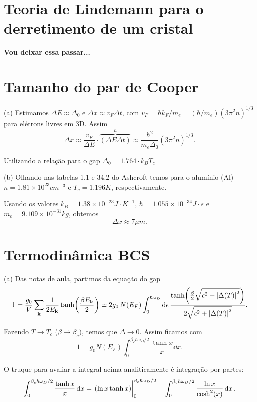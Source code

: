 \documentclass[a4paper,10pt]{article}
\begin{document}
\section{Teoria de Lindemann para o derretimento de um cristal}

\textbf{Vou deixar essa passar...}



\pagebreak


\section{Tamanho do par de Cooper}

(a) Estimamos $\Delta E \approx \Delta_0$ e $\Delta x \approx v_F \Delta t$, com $v_F = \hbar k_F / m_e = (\hbar/m_e) (3\pi^2 n)^{1/3}$ para elétrons livres em 3D. Assim
$$
\Delta x \approx
\frac{v_F}{\Delta E} \cdot \overbrace{(\Delta E \Delta t)}^{\hbar}
\approx \frac{\hbar^2}{m_e \Delta_0} (3\pi^2 n)^{1/3}.
$$

Utilizando a relação para o gap $\Delta_0 = 1.764 \cdot k_B T_c$

\n\n

(b) Olhando nas tabelas 1.1 e 34.2 do Ashcroft temos para o alumínio (Al) $n = 1.81 \times 10^{23} \unit{cm^{-3}}$ e $T_c = 1.196 \unit{K}$, respectivamente.

\n

Usando os valores $k_B = 1.38 \times 10^{-23} \unit{J \cdot K^{-1}}$, $\hbar = 1.055 \times 10^{-34} \unit{J \cdot s}$ e $m_e = 9.109 \times 10^{-31} \unit{kg}$, obtemos
$$
\boxed{ \Delta x \approx 7 \unit{\mu m}. }
$$

\pagebreak


\section{Termodinâmica BCS}

(a) Das notas de aula, partimos da equação do gap
$$
1 = \frac{g_0}{V} \sum_{\vb{k}} \frac{1}{2 E_{\vb{k}}} \tanh(\frac{\beta E_{\vb{k}}}{2})
\simeq
2 g_0 \, N(E_F) \int_0^{\hbar \omega_D} \dd{\epsilon}
\frac{\tanh(\frac{\beta}{2} \sqrt{\epsilon^2 + \abs{\Delta(T)}^2})}
{2 \sqrt{\epsilon^2 + \abs{\Delta(T)}^2}}.
$$

Fazendo $T \to T_c$ ($\beta \to \beta_c)$, temos que $\Delta \to 0$. Assim ficamos com
$$
1 = g_0 N(E_F) \int_0^{\beta_c \hbar \omega_D / 2} \frac{\tanh x}{x} \dd{x}.
$$

O truque para avaliar a integral acima analiticamente é integração por partes:
$$
\int_0^{\beta_c \hbar \omega_D / 2} \frac{\tanh x}{x} \dd{x} =
\eval{\qty(\ln x \tanh x)}_{0}^{\beta_c \hbar \omega_D / 2} -
\int_0^{\beta_c \hbar \omega_D / 2} \frac{\ln x}{\cosh[2](x)} \dd{x}.
$$
\end{document}

